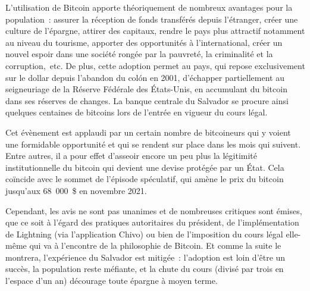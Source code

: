 L'utilisation de Bitcoin apporte théoriquement de nombreux avantages pour la population~: assurer la réception de fonds transférés depuis l'étranger, créer une culture de l'épargne, attirer des capitaux, rendre le pays plus attractif notamment au niveau du tourisme, apporter des opportunités à l'international, créer un nouvel espoir dans une société rongée par la pauvreté, la criminalité et la corruption,~etc. De plus, cette adoption permet au pays, qui repose exclusivement sur le dollar depuis l'abandon du colón en 2001, d'échapper partiellement au seigneuriage de la Réserve Fédérale des États-Unis, en accumulant du bitcoin dans ses réserves de changes. La banque centrale du Salvador se procure ainsi quelques centaines de bitcoins lors de l'entrée en vigueur du cours légal.

Cet évènement est applaudi par un certain nombre de bitcoineurs qui y voient une formidable opportunité et qui se rendent sur place dans les mois qui suivent. Entre autres, il a pour effet d'asseoir encore un peu plus la légitimité institutionnelle du bitcoin qui devient une devise protégée par un État. Cela coïncide avec le sommet de l'épisode spéculatif, qui amène le prix du bitcoin jusqu'aux 68~000~\$ en novembre 2021.

Cependant, les avis ne sont pas unanimes et de nombreuses critiques sont émises, que ce soit à l'égard des pratiques autoritaires du président, de l'implémentation de Lightning (via l'application Chivo) ou bien de l'imposition du cours légal elle-même qui va à l'encontre de la philosophie de Bitcoin. Et comme la suite le montrera, l'expérience du Salvador est mitigée~: l'adoption est loin d'être un succès, la population reste méfiante, et la chute du cours (divisé par trois en l'espace d'un an) décourage toute épargne à moyen terme.

